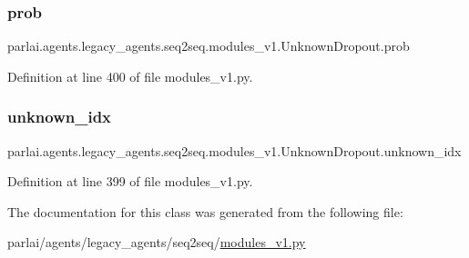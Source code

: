 \subsubsection{\texorpdfstring{prob}{prob}}
{\footnotesize\ttfamily parlai.\+agents.\+legacy\+\_\+agents.\+seq2seq.\+modules\+\_\+v1.\+Unknown\+Dropout.\+prob}



Definition at line 400 of file modules\+\_\+v1.\+py.

\mbox{\label{classparlai_1_1agents_1_1legacy__agents_1_1seq2seq_1_1modules__v1_1_1UnknownDropout_a7c6fe2c4afa06bf542c36ea9821b243f}} 
\subsubsection{\texorpdfstring{unknown\+\_\+idx}{unknown\_idx}}
{\footnotesize\ttfamily parlai.\+agents.\+legacy\+\_\+agents.\+seq2seq.\+modules\+\_\+v1.\+Unknown\+Dropout.\+unknown\+\_\+idx}



Definition at line 399 of file modules\+\_\+v1.\+py.



The documentation for this class was generated from the following file\+:\begin{DoxyCompactItemize}
\item 
parlai/agents/legacy\+\_\+agents/seq2seq/\hyperlink{modules__v1_8py}{modules\+\_\+v1.\+py}\end{DoxyCompactItemize}
